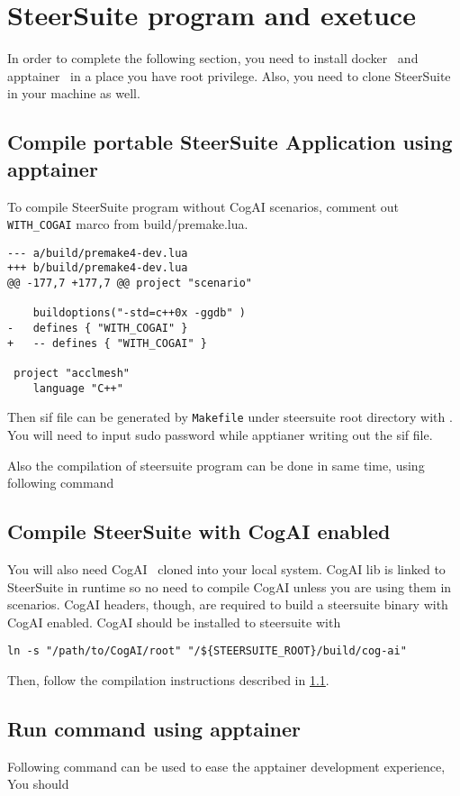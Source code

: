 \chapter{SteerSuite program and exetuce}

In order to complete the following section, you need to install docker~\cite{docker} and apptainer~\cite{apptainer} in a 
place you have root privilege. Also, you need to clone SteerSuite~\cite{kdresearch-steersuite} in your machine as well.

\section{Compile portable SteerSuite Application using apptainer}

\label{sec:steersuite-compile}
To compile SteerSuite program without CogAI scenarios, comment out \verb"WITH_COGAI" marco from build/premake.lua.

\begin{verbatim}
--- a/build/premake4-dev.lua
+++ b/build/premake4-dev.lua
@@ -177,7 +177,7 @@ project "scenario"
    
    buildoptions("-std=c++0x -ggdb" )   
-   defines { "WITH_COGAI" }
+   -- defines { "WITH_COGAI" }
 
 project "acclmesh"
    language "C++"
\end{verbatim}

Then sif file can be generated by \texttt{Makefile} under steersuite root directory with
.
You will need to input sudo password while apptianer writing out the sif file.

Also the compilation of steersuite program can be done in same time, using following command

\section{Compile SteerSuite with CogAI enabled}

You will also need CogAI~\cite{kdresearch-cogai} cloned into your local system. CogAI lib is linked to SteerSuite in 
runtime so no need to compile CogAI unless you are using them in scenarios. CogAI headers, though, are required to build 
a steersuite binary with CogAI enabled. CogAI should be installed to steersuite with

\begin{verbatim}
ln -s "/path/to/CogAI/root" "/${STEERSUITE_ROOT}/build/cog-ai" 
\end{verbatim}

Then, follow the compilation instructions described in \ref{sec:steersuite-compile}.

\section{Run command using apptainer}

Following command can be used to ease the apptainer development experience, You should 


\printbibliography
